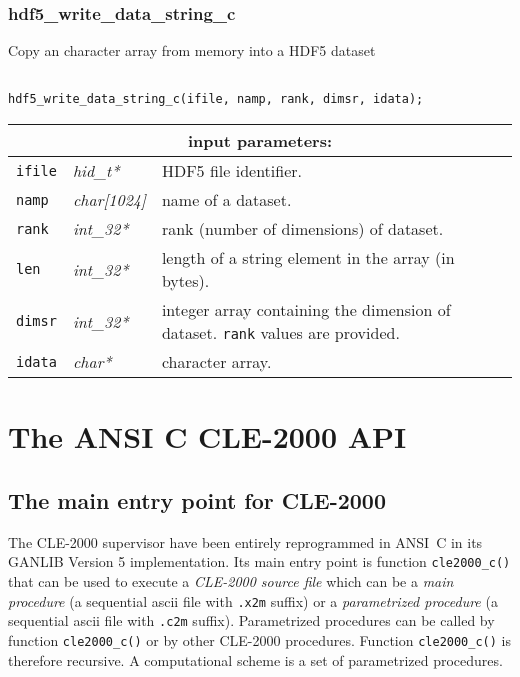 \subsubsection{hdf5\_write\_data\_string\_c}

Copy an character array from memory into a HDF5 dataset

\begin{verbatim}

hdf5_write_data_string_c(ifile, namp, rank, dimsr, idata);
\end{verbatim}

\noindent
\begin{tabular}{|p{1.5cm}|p{2cm}|p{11cm}|}
\hline
\multicolumn{3}{|c|}{\bf input parameters:} \\
\hline
{\tt ifile} & {\it hid\_t*} & HDF5 file identifier. \\
\hline
{\tt namp} & {\it char[1024]} & name of a dataset. \\
\hline
{\tt rank} & {\it int\_32*} & rank (number of dimensions) of dataset. \\
\hline
{\tt len} & {\it int\_32*} & length of a string element in the array (in bytes). \\
\hline
{\tt dimsr} & {\it int\_32*} & integer array containing the dimension of dataset. {\tt rank} values are provided. \\
\hline
{\tt idata} & {\it char*} & character array. \\
\hline
\end{tabular}

\clearpage

\section {The ANSI C CLE-2000 API}\label{sect:cle2000apiC}

\subsection {The main entry point for CLE-2000}

The CLE-2000 supervisor have been entirely reprogrammed in ANSI~C in its GANLIB Version 5 implementation. Its main entry
point is function {\tt cle2000\_c()} that can be used to execute a {\sl CLE-2000 source file} which can be a {\sl main procedure}
(a sequential {\sc ascii} file with {\tt .x2m} suffix) or a {\sl parametrized procedure} (a sequential {\sc ascii} file with {\tt .c2m} suffix).
Parametrized procedures can be called by function {\tt cle2000\_c()} or by other CLE-2000 procedures. Function {\tt cle2000\_c()} is therefore 
recursive. A computational scheme is a set of parametrized procedures.


